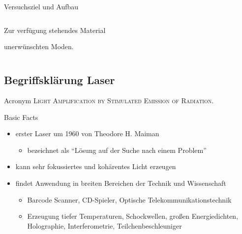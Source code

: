 \documentclass[10pt, aspectratio=169]{beamer}
\begin{document}
\begin{frame}{Versuchsziel und Aufbau}
\begin{columns}
{\begin{block}{Zur verf\"ugung stehendes Material}
\begin{description}
{            unerw\"unschten Moden.  } 
        \end{description}
      \end{block}
    }
  \end{columns}
\end{frame}

\subsection{Begriffskl\"arung Laser}
\begin{frame}
  \begin{block}{Acronym}
    \textsc{Light Amplification by Stimulated Emission of Radiation.}
  \end{block}

  \pause

  \begin{block}{Basic Facts}
    \begin{itemize}
    \item erster Laser um 1960 von Theodore H. Maiman
      \begin{itemize}
      \item bezeichnet als ``L\"osung auf der Suche nach einem
        Problem''~\cite{2010}
      \end{itemize}
    \item kann sehr fokussiertes und koh\"arentes Licht erzeugen
    \item findet Anwendung in breiten Bereichen der Technik und
      Wissenschaft
      \begin{itemize}
      \item Barcode Scanner, CD-Spieler, Optische
        Telekommunikationstechnik
      \item Erzeugung tiefer Temperaturen, Schockwellen, gro\ss{}en
        Energiedichten, Holographie, Interferometrie,
        Teilchenbeschleuniger
      \end{itemize}
    \end{itemize}
  \end{block}
\end{frame}
\end{document}
